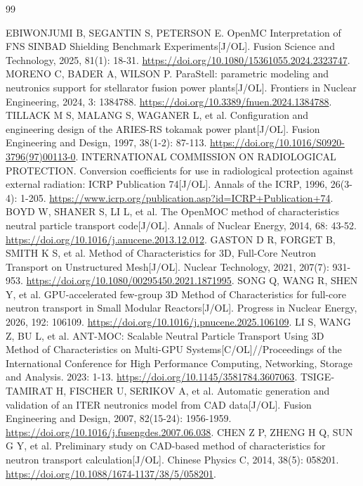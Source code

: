 \documentclass[UTF8, zihao=-4, fontset=none, a4paper]{ctexart}
\begin{document}
\clearpage
{}
{}
\begin{thebibliography}{99}
\setlength{\itemsep}{3pt}
\raggedright\small
{}EBIWONJUMI B, SEGANTIN S, PETERSON E. OpenMC Interpretation of FNS SINBAD Shielding Benchmark Experiments{[}J/OL{]}. Fusion Science and Technology, 2025, 81(1): 18-31. \url{https://doi.org/10.1080/15361055.2024.2323747}.
MORENO C, BADER A, WILSON P. ParaStell: parametric modeling and neutronics support for stellarator fusion power plants{[}J/OL{]}. Frontiers in Nuclear Engineering, 2024, 3: 1384788. \url{https://doi.org/10.3389/fnuen.2024.1384788}.
TILLACK M S, MALANG S, WAGANER L, et al. Configuration and engineering design of the ARIES-RS tokamak power plant{[}J/OL{]}. Fusion Engineering and Design, 1997, 38(1-2): 87-113. \url{https://doi.org/10.1016/S0920-3796(97)00113-0}.
INTERNATIONAL COMMISSION ON RADIOLOGICAL PROTECTION. Conversion coefficients for use in radiological protection against external radiation: ICRP Publication 74{[}J/OL{]}. Annals of the ICRP, 1996, 26(3-4): 1-205. \url{https://www.icrp.org/publication.asp?id=ICRP+Publication+74}.
BOYD W, SHANER S, LI L, et al. The OpenMOC method of characteristics neutral particle transport code{[}J/OL{]}. Annals of Nuclear Energy, 2014, 68: 43-52. \url{https://doi.org/10.1016/j.anucene.2013.12.012}.
GASTON D R, FORGET B, SMITH K S, et al. Method of Characteristics for 3D, Full-Core Neutron Transport on Unstructured Mesh{[}J/OL{]}. Nuclear Technology, 2021, 207(7): 931-953. \url{https://doi.org/10.1080/00295450.2021.1871995}.
SONG Q, WANG R, SHEN Y, et al. GPU-accelerated few-group 3D Method of Characteristics for full-core neutron transport in Small Modular Reactors{[}J/OL{]}. Progress in Nuclear Energy, 2026, 192: 106109. \url{https://doi.org/10.1016/j.pnucene.2025.106109}.
LI S, WANG Z, BU L, et al. ANT-MOC: Scalable Neutral Particle Transport Using 3D Method of Characteristics on Multi-GPU Systems{[}C/OL{]}//Proceedings of the International Conference for High Performance Computing, Networking, Storage and Analysis. 2023: 1-13. \url{https://doi.org/10.1145/3581784.3607063}.
TSIGE-TAMIRAT H, FISCHER U, SERIKOV A, et al. Automatic generation and validation of an ITER neutronics model from CAD data{[}J/OL{]}. Fusion Engineering and Design, 2007, 82(15-24): 1956-1959. \url{https://doi.org/10.1016/j.fusengdes.2007.06.038}.
CHEN Z P, ZHENG H Q, SUN G Y, et al. Preliminary study on CAD-based method of characteristics for neutron transport calculation{[}J/OL{]}. Chinese Physics C, 2014, 38(5): 058201. \url{https://doi.org/10.1088/1674-1137/38/5/058201}.

\end{thebibliography}
\end{document}
